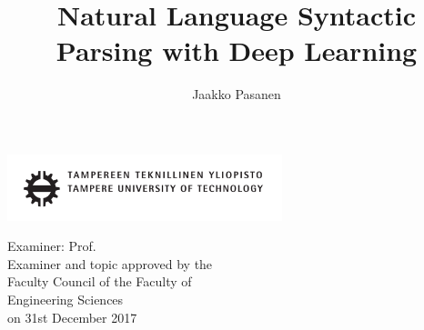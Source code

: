 \documentclass[12pt,a4paper,english
]{tutthesis}
\author{Jaakko Pasanen}
\title{Natural Language Syntactic Parsing with Deep Learning} %
\begin{document}
\makeatletter

%
\thispagestyle{empty}
\vspace*{-.5cm}\noindent
\includegraphics[width=8cm]{tty_tut_logo}   %

\vspace{6.8cm}
\maketitle
\vspace{6.7cm} %

\begin{flushright}  
  \begin{minipage}[c]{6.8cm}
    \begin{spacing}{1.0}
      \textsf{Examiner: Prof. \@examiner}\\
      \textsf{Examiner and topic approved by the}\\ 
      \textsf{Faculty Council of the Faculty of}\\
      \textsf{Engineering Sciences}\\
      \textsf{on 31st December 2017}\\
    \end{spacing}
  \end{minipage}
\end{flushright}

\if@twoside
\clearpage
\fi

%
\setcounter{page}{0} %
\end{document}
